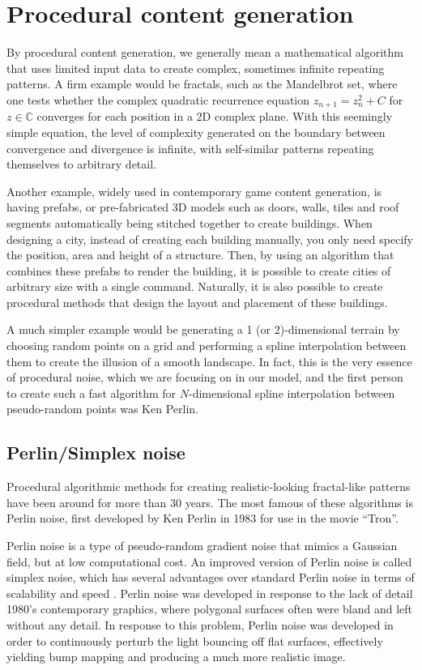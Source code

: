 \documentclass[aps,pre,twocolumn,letterpaper,floatfix,showpacs]{revtex4}
\begin{document}
\section{Procedural content generation}
By procedural content generation, we generally mean a mathematical algorithm that uses limited
input data to create complex, sometimes infinite repeating patterns.
A firm example would be fractals, such as the Mandelbrot set, where one
tests whether the complex quadratic recurrence equation $z_{n+1} = z_n^2 +C$ for $z \in \mathbb C$
converges for each position in a 2D complex plane.
With this seemingly simple equation, the level of complexity generated on the boundary between
convergence and divergence is infinite, with self-similar patterns repeating themselves to arbitrary detail.

Another example, widely used in contemporary game content generation, is having prefabs, or
pre-fabricated 3D models such as doors, walls, tiles and roof segments automatically being
stitched together to create buildings.
When designing a city, instead of creating each building manually, you only need specify the
position, area and height of a structure.
Then, by using an algorithm that combines these prefabs to render the building, it is possible
to create cities of arbitrary size with a single command.
Naturally, it is also possible to create procedural methods that design the layout and placement of these buildings.

A much simpler example would be generating a 1 (or 2)-dimensional terrain by choosing random
points on a grid and performing a spline interpolation between them to create the illusion of a smooth landscape.
In fact, this is the very essence of procedural noise, which we are focusing on in our model,
and the first person to create such a fast algorithm for $N$-dimensional spline interpolation
between pseudo-random points was Ken Perlin\cite{perlin1985image}.

\subsection{Perlin/Simplex noise}
\label{sec:perlin}

Procedural algorithmic methods for creating realistic-looking
fractal-like patterns have been around for more than 30 years. The most famous of these
algorithms is Perlin noise, first developed by Ken Perlin in 1983 for
use in the movie ``Tron''\cite{perlin1985image}. 

Perlin noise is a type of pseudo-random gradient noise that mimics a Gaussian field, but at low computational cost.
An improved version of Perlin noise is called simplex noise, which has several advantages
over standard Perlin noise in terms of scalability and speed \cite{perlin:2002}.
Perlin noise was developed in response to the lack of detail 1980's contemporary graphics,
where polygonal surfaces often were bland and left without any detail.
In response to this problem, Perlin noise was developed in order to continuously perturb
the light bouncing off flat surfaces, effectively yielding bump mapping and producing a much more realistic image.
\end{document}
